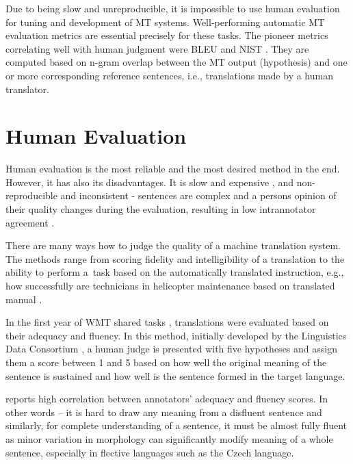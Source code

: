 Due to being slow and unreproducible, it is impossible to use human evaluation
for tuning and development of MT systems. Well-performing automatic MT 
evaluation metrics are essential precisely for these tasks. The pioneer metrics 
correlating well with human judgment were BLEU \cite{bleu} and NIST \cite{nist}. 
They are computed based on n-gram overlap between the MT output (hypothesis) and 
one or more corresponding reference sentences, i.e., translations made by a human 
translator.




\section{Human Evaluation}
Human evaluation is the most reliable and the most desired method in the end.
However, it has also its disadvantages. It is slow and expensive , 
and non-reproducible and inconsistent - sentences are complex and a persons
opinion of their quality changes during the evaluation, resulting in low
intrannotator agreement .

There are many ways how to judge the quality of a machine translation system. 
The methods range from scoring fidelity and intelligibility of a translation
to the ability to perform a~task based on the automatically translated instruction, e.g., 
how successfully are technicians in  helicopter maintenance based on translated 
manual \cite{Sinaiko}.

In the first year of WMT shared tasks \citep{koehn-monz:2006:WMT}, translations
were evaluated based on their adequacy and fluency. In this method, initially  
developed by the Linguistics Data Consortium ,  a human judge 
is presented with five hypotheses and assign them a score between 1 and 5 based 
on how well the original meaning of the sentence is sustained and how well is the 
sentence formed in the target language.

\cite{callison-burch-etal-2007-meta} reports high correlation between annotators’ 
adequacy and fluency scores. In other words -- it is hard to draw any meaning
from a disfluent sentence and similarly, for complete understanding of a sentence,
it must be almost fully fluent as minor variation in morphology can significantly
modify meaning of a whole sentence, especially in flective languages such as the 
Czech language. 

